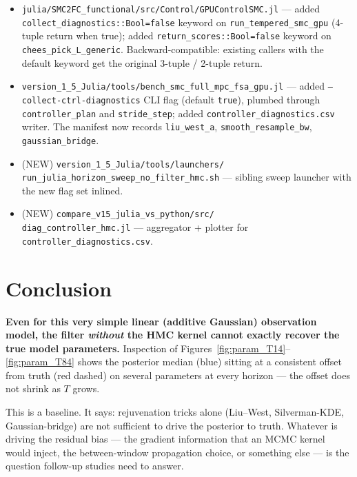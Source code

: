 \documentclass[11pt,a4paper]{article}
\begin{document}
\begin{itemize}[itemsep=2pt]
  \item \texttt{julia/SMC2FC\_functional/src/Control/GPUControlSMC.jl}
        — added \texttt{collect\_diagnostics::Bool=false} keyword on
        \texttt{run\_tempered\_smc\_gpu} (4-tuple return when true);
        added \texttt{return\_scores::Bool=false} keyword on
        \texttt{chees\_pick\_L\_generic}. Backward-compatible: existing
        callers with the default keyword get the original 3-tuple /
        2-tuple return.
  \item \texttt{version\_1\_5\_Julia/tools/bench\_smc\_full\_mpc\_fsa\_gpu.jl}
        — added \texttt{--collect-ctrl-diagnostics} CLI flag (default
        \texttt{true}), plumbed through \texttt{controller\_plan} and
        \texttt{stride\_step}; added \texttt{controller\_diagnostics.csv}
        writer. The manifest now records \texttt{liu\_west\_a},
        \texttt{smooth\_resample\_bw}, \texttt{gaussian\_bridge}.
  \item (NEW) \texttt{version\_1\_5\_Julia/tools/launchers/}\\
        \texttt{run\_julia\_horizon\_sweep\_no\_filter\_hmc.sh}
        — sibling sweep launcher with the new flag set inlined.
  \item (NEW) \texttt{compare\_v15\_julia\_vs\_python/src/}\\
        \texttt{diag\_controller\_hmc.jl} —
        aggregator + plotter for \texttt{controller\_diagnostics.csv}.
\end{itemize}


\section{Conclusion}
\label{sec:conclusion}

\textbf{Even for this very simple linear (additive Gaussian)
observation model, the filter \emph{without} the HMC kernel cannot
exactly recover the true model parameters.} Inspection of
Figures~\ref{fig:param_T14}--\ref{fig:param_T84} shows the posterior
median (blue) sitting at a consistent offset from truth (red dashed)
on several parameters at every horizon — the offset does not shrink
as $T$ grows.

This is a baseline. It says: rejuvenation tricks alone (Liu--West,
Silverman-KDE, Gaussian-bridge) are not sufficient to drive the
posterior to truth. Whatever is driving the residual bias — the
gradient information that an MCMC kernel would inject, the
between-window propagation choice, or something else — is the
question follow-up studies need to answer.
\end{document}
